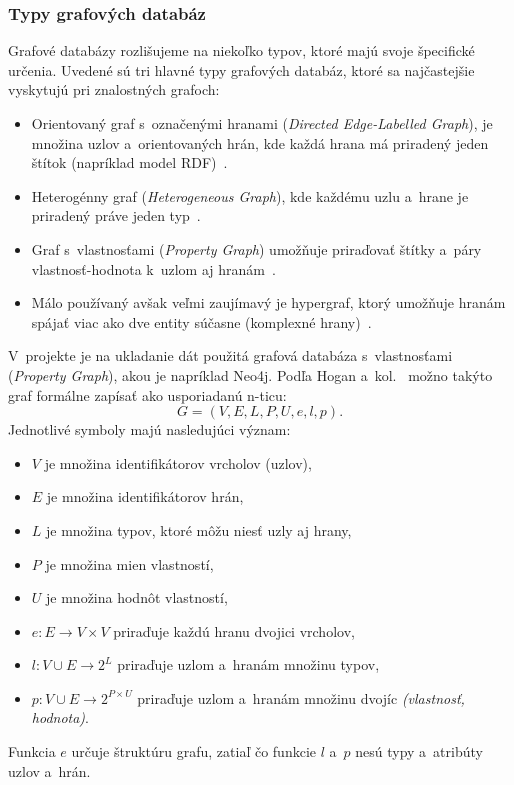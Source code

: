\subsubsection{Typy grafových databáz}
Grafové databázy rozlišujeme na niekoľko typov, ktoré majú svoje špecifické určenia. Uvedené sú tri hlavné typy grafových databáz, ktoré sa najčastejšie vyskytujú pri znalostných grafoch:
\begin{itemize}
  \item Orientovaný graf s~označenými hranami (\textit{Directed Edge-Labelled Graph}), je množina uzlov a~orientovaných hrán, kde každá hrana má priradený jeden štítok (napríklad model RDF)~\cite{hogan2021kg}.
  \item Heterogénny graf (\textit{Heterogeneous Graph}), kde každému uzlu a~hrane je priradený práve jeden typ~\cite{hogan2021kg}.
  \item Graf s~vlastnosťami (\textit{Property Graph}) umožňuje priraďovať štítky a~páry vlastnosť-hodnota k~uzlom aj hranám~\cite{hogan2021kg}.
  \item Málo používaný avšak veľmi zaujímavý je hypergraf, ktorý umožňuje hranám spájať viac ako dve entity súčasne (komplexné hrany)~\cite{hogan2021kg}.
\end{itemize}

V~projekte je na ukladanie dát použitá grafová databáza s~vlastnosťami (\textit{Property Graph}), akou je napríklad Neo4j. Podľa Hogan a~kol.~\cite{hogan2021kg} možno takýto graf formálne zapísať ako usporiadanú n-ticu:
\begin{equation}\label{eq:property-graph}
G = (V, E, L, P, U, e, l, p).
\end{equation}
Jednotlivé symboly majú nasledujúci význam:
\begin{itemize}
  \item $V$ je množina identifikátorov vrcholov (uzlov),
  \item $E$ je množina identifikátorov hrán,
  \item $L$ je množina typov, ktoré môžu niesť uzly aj hrany,
  \item $P$ je množina mien vlastností,
  \item $U$ je množina hodnôt vlastností,
  \item $e : E \to V \times V$ priraďuje každú hranu dvojici vrcholov,
  \item $l : V \cup E \to 2^{L}$ priraďuje uzlom a~hranám množinu typov,
  \item $p : V \cup E \to 2^{P \times U}$ priraďuje uzlom a~hranám množinu dvojíc \emph{(vlastnosť, hodnota)}.
\end{itemize}
Funkcia $e$ určuje štruktúru grafu, zatiaľ čo funkcie $l$ a~$p$ nesú typy a~atribúty uzlov a~hrán.

